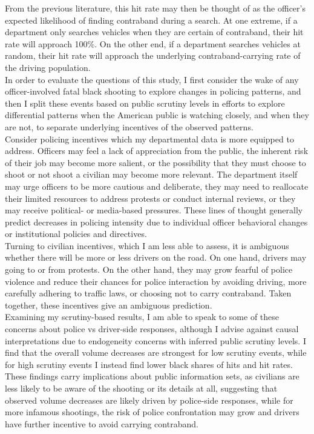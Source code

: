 From the previous literature, this hit rate may then be thought of as the officer's expected likelihood of finding contraband during a search. At one extreme, if a department only searches vehicles when they are certain of contraband, their hit rate will approach 100\%. On the other end, if a department searches vehicles at random, their hit rate will approach the underlying contraband-carrying rate of the driving population. \\

In order to evaluate the questions of this study, I first consider the wake of any officer-involved fatal black shooting to explore changes in policing patterns, and then I split these events based on public scrutiny levels in efforts to explore differential patterns when the American public is watching closely, and when they are not, to separate underlying incentives of the observed patterns. \\

Consider policing incentives which my departmental data is more equipped to address. Officers may feel a lack of appreciation from the public, the inherent risk of their job may become more salient, or the possibility that they must choose to shoot or not shoot a civilian may become more relevant. The department itself may urge officers to be more cautious and deliberate, they may need to reallocate their limited resources to address protests or conduct internal reviews, or they may receive political- or media-based pressures. These lines of thought generally predict decreases in policing intensity due to individual officer behavioral changes or institutional policies and directives. \\

Turning to civilian incentives, which I am less able to assess, it is ambiguous whether there will be more or less drivers on the road. On one hand, drivers may going to or from protests. On the other hand, they may grow fearful of police violence and reduce their chances for police interaction by avoiding driving, more carefully adhering to traffic laws, or choosing not to carry contraband. Taken together, these incentives give an ambiguous prediction. \\

Examining my scrutiny-based results, I am able to speak to some of these concerns about police vs driver-side responses, although I advise against causal interpretations due to endogeneity concerns with inferred public scrutiny levels. I find that the overall volume decreases are strongest for low scrutiny events, while for high scrutiny events I instead find lower black shares of hits and hit rates. These findings carry implications about public information sets, as civilians are less likely to be aware of the shooting or its details at all, suggesting that observed volume decreases are likely driven by police-side responses, while for more infamous shootings, the risk of police confrontation may grow and drivers have further incentive to avoid carrying contraband. \\

